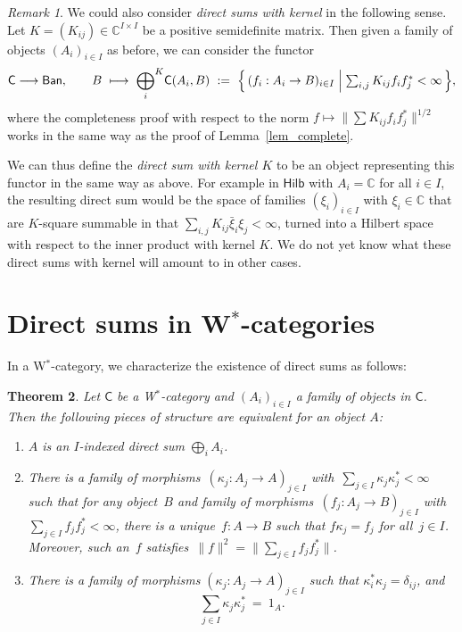 \documentclass[reqno,T1,11pt]{amsproc}
\newcommand{\beq}{\begin{equation}}
\newcommand{\eeq}{\end{equation}}
\newcommand{\C}{\mathbb{C}}
\newcommand{\cat}[1]{\mathsf{#1}}		%
\newcommand{\Ban}{\mathsf{Ban}}			%
\newcommand{\Hilb}{\mathsf{Hilb}} 		%
\theoremstyle{plain}
\newtheorem{thm}{Theorem}[section]
\theoremstyle{remark}
\newtheorem{rem}[thm]{Remark}
\numberwithin{equation}{section}
\begin{document}
\begin{rem}
	We could also consider \emph{direct sums with kernel} in the following sense. Let $K = (K_{ij}) \in \C^{I\times I}$ be a positive semidefinite matrix. Then given a family of objects $(A_i)_{i\in I}$ as before, we can consider the functor
	\[
		\cat{C}\longrightarrow \Ban, \qquad B\ \longmapsto\ {\bigoplus_i}^K \cat{C}(A_i, B)
        \ := \ \Bigl\{\,  \textstyle (f_i : A_i \to B)_{i\in I} \Bigm\vert \sum_{i,j} K_{ij} f_i f_j^* < \infty \,\Bigr\},
	\]
	where the completeness proof with respect to the norm $f\mapsto \| \sum K_{ij} f_i f_j^* \|^{1/2}$ works in the same way as the proof of Lemma~\ref{lem_complete}.

	We can thus define the \emph{direct sum with kernel $K$} to be an object representing this functor in the same way as above. For example in $\Hilb$ with $A_i = \C$ for all $i\in I$, the resulting direct sum would be the space of families $(\xi_i)_{i\in I}$ with $\xi_i\in\C$ that are $K$-square summable in that $\sum_{i,j} K_{ij} \bar{\xi}_i \xi_j < \infty$, turned into a Hilbert space with respect to the inner product with kernel $K$. We do not yet know what these direct sums with kernel will amount to in other cases.
\end{rem}

\section{Direct sums in W$^*$-categories}
\label{wstarcatcase}

In a W$^*$-category, we characterize the existence of direct sums as follows:

\begin{thm}
\label{directsum_equiv}
Let $\cat{C}$ be a W$^*$-category and $(A_i)_{i\in I}$ a family of objects in $\cat{C}$. Then the following pieces of structure are equivalent for an object $A$:
\begin{enumerate}
\item\label{universalprop} $A$ is an $I$-indexed direct sum $\bigoplus_i A_i$.
\item\label{universalprop2} 
There is a family of
        morphisms~$\left(\kappa_j : A_j \to A\right)_{j\in I}$
        with~$\sum_{j \in I} \kappa_j \kappa_j^* < \infty$
        such that for any object~$B$
        and family of
        morphisms~$\left(f_j: A_j \to B\right)_{j\in I}$
        with~$\sum_{j \in I}f_j f_j^* < \infty$,
        there is a unique~$f\colon A \to B$
        such that $f \kappa_j = f_j$ for all~$j \in I$.
Moreover, such an~$f$ satisfies~$\| f \|^2 = \| \sum_{j\in I} f_j f_j^* \|$.
\item\label{biprodsum} There is a family of morphisms $\left(\kappa_j : A_j \to A\right)_{j\in I}$ such that $\kappa_i^*\kappa_j = \delta_{ij}$, and
\beq
\label{complete}
        \sum_{j\in I} \kappa_j \kappa_j^* \ =\  1_A.
\eeq
\end{enumerate}
\end{thm}
\end{document}
